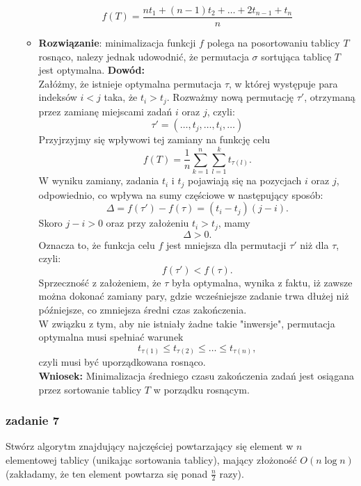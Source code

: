 \documentclass[11pt,a4paper]{article}
\begin{document}
\begin{itemize}
\begin{itemize}
            \[
                f(T) = \frac{nt_1 + (n-1)t_2 + \dots + 2t_{n-1} + t_n}{n}
            \]
        \item \textbf{Rozwiązanie}: minimalizacja funkcji $f$ polega na posortowaniu tablicy $T$ rosnąco, nalezy jednak udowodnić, że permutacja $\sigma$ sortująca tablicę $T$ jest optymalna.
            \textbf{Dowód:} \\[1mm]
            Załóżmy, że istnieje optymalna permutacja $\tau$, w której występuje para indeksów $i < j$ taka, że $t_i > t_j$. Rozważmy nową permutację $\tau'$, otrzymaną przez zamianę miejscami zadań $i$ oraz $j$, czyli:
            \[
                \tau' = (\dots, t_j, \dots, t_i, \dots)
            \]
            Przyjrzyjmy się wpływowi tej zamiany na funkcję celu
            \[
                f(T) = \frac{1}{n}\sum_{k=1}^{n} \sum_{l=1}^{k} t_{\tau(l)}.
            \]
            W wyniku zamiany, zadania $t_i$ i $t_j$ pojawiają się na pozycjach $i$ oraz $j$, odpowiednio, co wpływa na sumy częściowe w następujący sposób:
            \[
                \Delta = f(\tau') - f(\tau) = (t_i - t_j)(j-i).
            \]
            Skoro $j-i > 0$ oraz przy założeniu $t_i > t_j$, mamy
            \[
                \Delta > 0.
            \]
            Oznacza to, że funkcja celu $f$ jest mniejsza dla permutacji $\tau'$ niż dla $\tau$, czyli:
            \[
                f(\tau') < f(\tau).
            \]
            Sprzeczność z założeniem, że $\tau$ była optymalna, wynika z faktu, iż zawsze można dokonać zamiany pary, gdzie wcześniejsze zadanie trwa dłużej niż późniejsze, co zmniejsza średni czas zakończenia. \\[1mm]
            W związku z tym, aby nie istniały żadne takie "inwersje", permutacja optymalna musi spełniać warunek
            \[
                t_{\tau(1)} \le t_{\tau(2)} \le \dots \le t_{\tau(n)},
            \]
            czyli musi być uporządkowana rosnąco. \\[1mm]
            \textbf{Wniosek:} Minimalizacja średniego czasu zakończenia zadań jest osiągana przez sortowanie tablicy $T$ w porządku rosnącym.
        \end{itemize}
\end{itemize}

\subsubsection{zadanie 7}
Stwórz algorytm znajdujący najczęściej powtarzający się element w $n$ elementowej tablicy (unikając sortowania tablicy), mający złożoność $O(n \log n)$ (zakładamy, że ten element powtarza się ponad $\frac{n}{2}$ razy).
\end{document}
